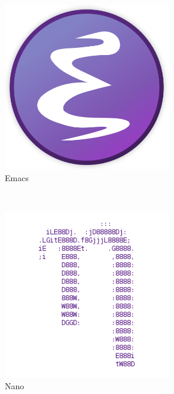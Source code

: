 \documentclass[14pt]{article}
\begin{document}
	\begin{figure}[h]
		\centering
		\begin{subfigure}{0.3\textwidth}
			\includegraphics[width=0.8\textwidth]{emacslogo.png}
			\caption{Emacs}
		\end{subfigure}
		~
		\begin{subfigure}{0.3\textwidth}
			\includegraphics[width=0.8\textwidth]{nanologo.png}
			\caption{Nano}
		\end{subfigure}
		~
		\begin{subfigure}{0.3\textwidth}

\end{subfigure}
\end{figure}
\end{document}

